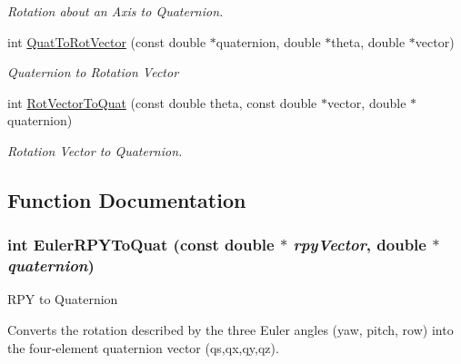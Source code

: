 \begin{CompactItemize}
\begin{CompactList}\small\item\em Rotation about an Axis to Quaternion. \item\end{CompactList}\item 
int \hyperlink{group__quaternion_g5c214fb206a96292a7596d1df089f52e}{QuatToRotVector} (const double $\ast$quaternion, double $\ast$theta, double $\ast$vector)
\begin{CompactList}\small\item\em Quaternion to Rotation Vector \item\end{CompactList}\item 
int \hyperlink{group__quaternion_g3ba8927f691411d3a01bba3d5cc52838}{RotVectorToQuat} (const double theta, const double $\ast$vector, double $\ast$quaternion)
\begin{CompactList}\small\item\em Rotation Vector to Quaternion. \item\end{CompactList}\end{CompactItemize}


\subsection{Function Documentation}
\hypertarget{group__quaternion_g7b1db600de72218b50d586962dcb3b34}{
\subsubsection[EulerRPYToQuat]{\setlength{\rightskip}{0pt plus 5cm}int EulerRPYToQuat (const double $\ast$ {\em rpyVector}, \/  double $\ast$ {\em quaternion})}}
\label{group__quaternion_g7b1db600de72218b50d586962dcb3b34}


RPY to Quaternion 

Converts the rotation described by the three Euler angles (yaw, pitch, row) into the four-element quaternion vector (qs,qx,qy,qz).

